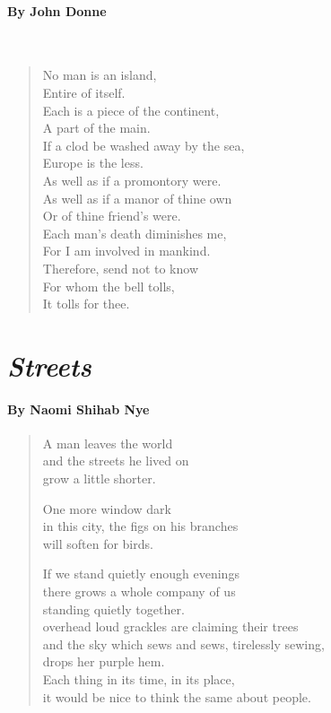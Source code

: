 \documentclass[11pt, letterpaper]{memoir}
\begin{document}
{  \paragraph{By John Donne}~

  \begin{verse}
  No man is an island,\\
  Entire of itself.\\
  Each is a piece of the continent,\\
  A part of the main.\\
  If a clod be washed away by the sea,\\
  Europe is the less.\\
  As well as if a promontory were.\\
  As well as if a manor of thine own\\
  Or of thine friend's were.\\
  Each man's death diminishes me,\\
  For I am involved in mankind.\\
  Therefore, send not to know\\
  For whom the bell tolls,\\
  It tolls for thee.\\
  \end{verse}

  \hspace{18em}
  \begin{minipage}{0.7\linewidth}
    \section*{\emph{Streets}}
    \paragraph{By Naomi Shihab Nye}

    \begin{verse}
    A man leaves the world\\
    and the streets he lived on\\
    grow a little shorter.

    One more window dark\\
    in this city, the figs on his branches\\
    will soften for birds.

    If we stand quietly enough evenings\\
    there grows a whole company of us\\
    standing quietly together.\\
    overhead loud grackles are claiming their trees  \\
    and the sky which sews and sews, tirelessly sewing,\\
    drops her purple hem.\\
    Each thing in its time, in its place,\\
    it would be nice to think the same about people.


\end{verse}
\end{minipage}}
\end{document}
